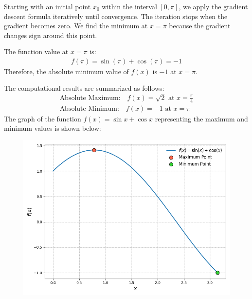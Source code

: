 \documentclass[journal]{IEEEtran}
\begin{document}
\begin{enumerate}
Starting with an initial point $x_0$ within the interval $[0, \pi]$, we apply the gradient descent formula iteratively until convergence. The iteration stops when the gradient becomes zero. We find the minimum at $x = \pi$ because the gradient changes sign around this point.

The function value at $x = \pi$ is:
\begin{align}
    f(\pi) = \sin(\pi) + \cos(\pi) = -1
\end{align}
Therefore, the absolute minimum value of $f(x)$ is $-1$ at $x = \pi$.

\vspace{2mm}

The computational results are summarized as follows:
\begin{align}
    \text{Absolute Maximum:} \quad f(x) = \sqrt{2} \text{ at } x = \frac{\pi}{4} \\
    \text{Absolute Minimum:} \quad f(x) = -1 \text{ at } x = \pi
\end{align}
The graph of the function $f(x) = \sin{x} + \cos{x}$ representing the maximum and minimum values is shown below:
\begin{figure}
    \centering
    \includegraphics[width=\columnwidth]{figs/fig.png}
\end{figure}
\end{enumerate}
\end{document}
